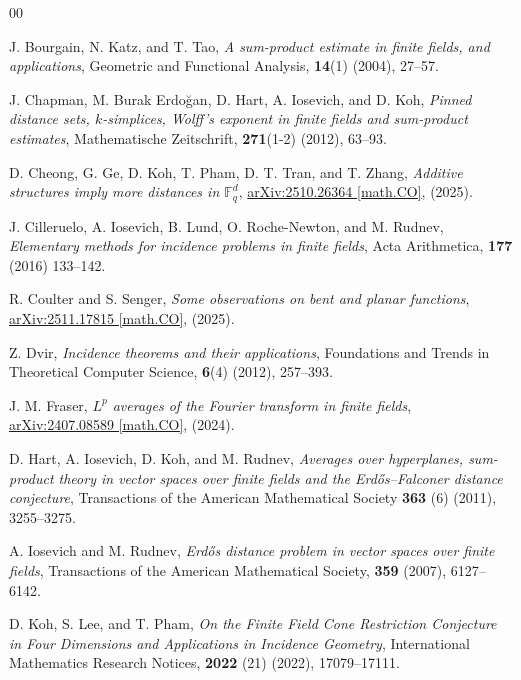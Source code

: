 \documentclass{article}
\begin{document}
\begin{thebibliography}{00}


  J. Bourgain, N. Katz, and T. Tao, \textit{A sum-product estimate in finite fields, and applications}, Geometric and Functional Analysis, \textbf{14}(1) (2004), 27--57.

J. Chapman, M. Burak {Erdo\u{g}an}, D. Hart, A. Iosevich, and D. Koh, \textit{Pinned distance sets, {$k$}-simplices, {W}olff's exponent in finite fields and sum-product estimates}, Mathematische Zeitschrift, \textbf{271}(1-2) (2012), 63--93.

D. Cheong, G. Ge, D. Koh, T. Pham, D. T. Tran, and T. Zhang, \textit{Additive structures imply more distances in $\mathbb {F} _q^ d$}, \href{https://arxiv.org/abs/2510.26364}{arXiv:2510.26364 [math.CO]}, (2025).

 J. Cilleruelo, A. Iosevich, B. Lund, O. Roche-Newton, and M. Rudnev, \textit{Elementary methods for incidence problems in finite fields}, Acta Arithmetica, \textbf{177} (2016) 133--142.

 R. Coulter and S. Senger, \textit{Some observations on bent and planar functions}, \href{https://arxiv.org/abs/2511.17815}{arXiv:2511.17815 [math.CO]}, (2025).

 Z. Dvir, \textit{Incidence theorems and their applications}, Foundations and Trends in Theoretical Computer Science, \textbf{6}(4) (2012), 257--393.

J. M. Fraser, \textit{$L^p$ averages of the Fourier transform in finite fields}, 
\href{https://arxiv.org/abs/2407.08589}{arXiv:2407.08589 [math.CO]}, (2024).


D. Hart, A. Iosevich, D. Koh, and M. Rudnev, \textit{Averages over hyperplanes, sum-product theory in vector spaces over finite fields and the Erd\H{o}s–Falconer distance conjecture}, Transactions of the American Mathematical Society \textbf{363} (6) (2011), 3255--3275.

A. Iosevich and M. Rudnev, \textit{Erd\H{o}s distance problem in vector spaces over finite fields}, Transactions of the American Mathematical Society, \textbf{359} (2007), 6127--6142.

D. Koh, S. Lee, and T. Pham, 
\textit{On the Finite Field Cone Restriction Conjecture in Four Dimensions and Applications in Incidence Geometry}, International Mathematics Research Notices, \textbf{2022} (21) (2022), 17079--17111.


\end{thebibliography}
\end{document}
